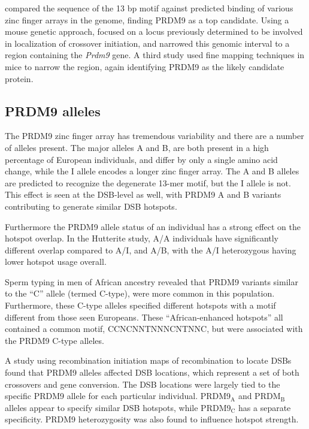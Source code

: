 \citet{Myers2010} compared the sequence of the 13 bp motif against predicted binding of various zinc finger arrays in the genome, finding PRDM9 as a top candidate.
Using a mouse genetic approach, \citet{Baudat2010} focused on a locus previously determined to be involved in localization of crossover initiation\cite{Grey2009,Parvanov2009},
and narrowed this genomic interval to a region containing the \textit{Prdm9} gene.
A third study used fine mapping techniques in mice to narrow the region, again identifying PRDM9 as the likely candidate protein\cite{Parvanov2010}.

\subsection{PRDM9 alleles}

The PRDM9 zinc finger array has tremendous variability and there are a number of alleles present.
The major alleles A and B, are both present in a high percentage of European individuals, and differ by only a single amino acid change, while the I allele encodes a longer zinc finger array\cite{Baudat2010}.
The A and B alleles are predicted to recognize the degenerate 13-mer motif, but the I allele is not\cite{Baudat2010}.
This effect is seen at the DSB-level as well, with PRDM9 A and B variants contributing to generate similar DSB hotspots\cite{Pratto2014}.

Furthermore the PRDM9 allele status of an individual has a strong effect on the hotspot overlap.
In the Hutterite study, A/A individuals have significantly different overlap compared to A/I, and A/B, with the A/I heterozygous having lower hotspot usage overall\cite{Baudat2010}.

Sperm typing in men of African ancestry revealed that PRDM9 variants similar to the ``C'' allele (termed C-type), were more common in this population.
Furthermore, these C-type alleles specified different hotspots with a motif different from those seen Europeans\cite{Berg2011}. 
These ``African-enhanced hotspots'' all contained a common motif, CCNCNNTNNNCNTNNC, but were associated with the PRDM9 C-type alleles.

A study using recombination initiation maps of recombination to locate DSBs found that PRDM9 alleles affected DSB locations, which represent a set of both crossovers and gene conversion\cite{Pratto2014}.
The DSB locations were largely tied to the specific PRDM9 allele for each particular individual.
PRDM9$_\text{A}$ and PRDM$_\text{B}$ alleles appear to specify similar DSB hotspots, while PRDM9$_\text{C}$ has a separate specificity.
PRDM9 heterozygosity was also found to influence hotspot strength.




